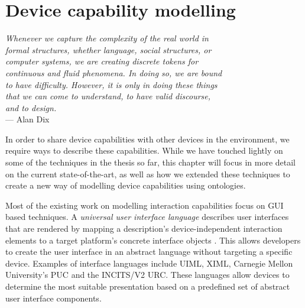 \chapter{Device capability modelling}
\label{DeviceCapabilityModelling}

\begin{flushright}{\slshape    
Whenever we capture the complexity of the real world in \\
formal structures, whether language, social structures, or \\
computer systems, we are creating discrete tokens for \\
continuous and fluid phenomena. In doing so, we are bound \\
to have difficulty. However, it is only in doing these things\\
 that we can come to understand, to have valid discourse,\\
 and to design.} \\ \medskip
    ---  Alan Dix
\end{flushright}



In order to share device capabilities with other devices in the environment, we require ways to describe these capabilities. While we have touched lightly on some of the techniques in the thesis so far, this chapter will focus in more detail on the current state-of-the-art, as well as how we extended these techniques to create a new way of modelling device capabilities using ontologies.

Most of the existing work on modelling interaction capabilities focus on \ac{GUI} based techniques. A \emph{universal user interface language} describes user interfaces that are rendered by mapping a description's device-independent interaction elements to a target platform's concrete interface objects \cite{Lee2006}. This allows developers to create the user interface in an abstract language without targeting a specific device. Examples of interface languages include \ac{UIML}, \ac{XIML}, Carnegie Mellon University's  \ac{PUC} and the \ac{INCITS/V2 URC}. These languages allow devices to determine the most suitable presentation based on a predefined set of abstract user interface components.

